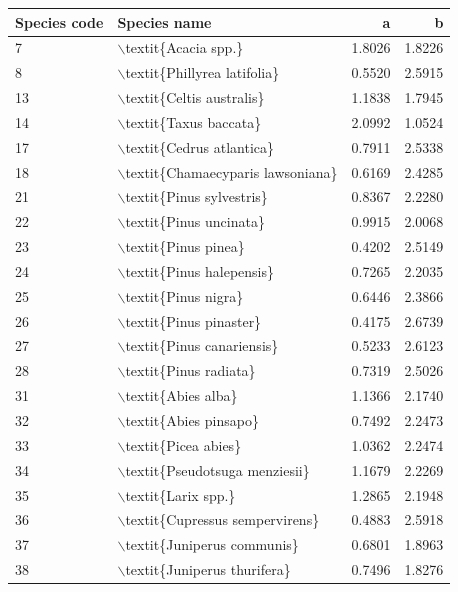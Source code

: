 \begin{table}[ht]
\centering
\begin{tabular}{llrr}
  \hline
Species code & Species name & a & b \\ 
  \hline
7 & $\backslash$textit\{Acacia spp.\} & 1.8026 & 1.8226 \\ 
  8 & $\backslash$textit\{Phillyrea latifolia\} & 0.5520 & 2.5915 \\ 
  13 & $\backslash$textit\{Celtis australis\} & 1.1838 & 1.7945 \\ 
  14 & $\backslash$textit\{Taxus baccata\} & 2.0992 & 1.0524 \\ 
  17 & $\backslash$textit\{Cedrus atlantica\} & 0.7911 & 2.5338 \\ 
  18 & $\backslash$textit\{Chamaecyparis lawsoniana\} & 0.6169 & 2.4285 \\ 
  21 & $\backslash$textit\{Pinus sylvestris\} & 0.8367 & 2.2280 \\ 
  22 & $\backslash$textit\{Pinus uncinata\} & 0.9915 & 2.0068 \\ 
  23 & $\backslash$textit\{Pinus pinea\} & 0.4202 & 2.5149 \\ 
  24 & $\backslash$textit\{Pinus halepensis\} & 0.7265 & 2.2035 \\ 
  25 & $\backslash$textit\{Pinus nigra\} & 0.6446 & 2.3866 \\ 
  26 & $\backslash$textit\{Pinus pinaster\} & 0.4175 & 2.6739 \\ 
  27 & $\backslash$textit\{Pinus canariensis\} & 0.5233 & 2.6123 \\ 
  28 & $\backslash$textit\{Pinus radiata\} & 0.7319 & 2.5026 \\ 
  31 & $\backslash$textit\{Abies alba\} & 1.1366 & 2.1740 \\ 
  32 & $\backslash$textit\{Abies pinsapo\} & 0.7492 & 2.2473 \\ 
  33 & $\backslash$textit\{Picea abies\} & 1.0362 & 2.2474 \\ 
  34 & $\backslash$textit\{Pseudotsuga menziesii\} & 1.1679 & 2.2269 \\ 
  35 & $\backslash$textit\{Larix spp.\} & 1.2865 & 2.1948 \\ 
  36 & $\backslash$textit\{Cupressus sempervirens\} & 0.4883 & 2.5918 \\ 
  37 & $\backslash$textit\{Juniperus communis\} & 0.6801 & 1.8963 \\ 
  38 & $\backslash$textit\{Juniperus thurifera\} & 0.7496 & 1.8276 \\ 

\end{tabular}
\end{table}

